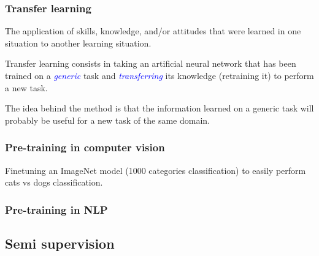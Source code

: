 \documentclass[9pt]{beamer}
\begin{document}
\begin{frame}

  \frametitle{Transfer learning}

  \begin{displayquote}[Perkins, 1992]
  The application of skills, knowledge, and/or attitudes that were
  learned in one situation to another learning situation.
  \end{displayquote}

  \bigskip

  Transfer learning consists in taking an artificial neural network
  that has been trained on a \textcolor{blue}{\emph{generic}} task and
  \textcolor{blue}{\emph{transferring}} its knowledge (retraining it) to perform a new
  task.

  \bigskip

  The idea behind the method is that the information learned on a
  generic task will probably be useful for a new task of the same
  domain.

\end{frame}

\begin{frame}

  \frametitle{Pre-training in computer vision}

  Finetuning an ImageNet model (1000 categories classification) to
  easily perform cats vs dogs classification.

\end{frame}

\begin{frame}

  \frametitle{Pre-training in NLP}

\end{frame}

\subsection{Semi supervision}

\begin{frame}

\end{frame}

\end{document}
